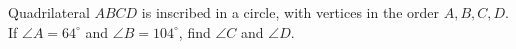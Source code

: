 Quadrilateral $ABCD$ is inscribed in a circle, with vertices in the order $A,B,C,D$. If $\angle A=64^\circ$ and $\angle B=104^\circ$, find $\angle C$ and $\angle D$.
